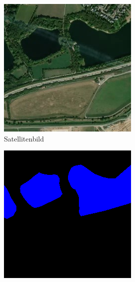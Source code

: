 \begin{figure}
    \centering
    \begin{subfigure}{0.3\textwidth}
        \centering
        \includegraphics[width=\textwidth]{images/datensatz_beispiel_satellit.jpg}
        \caption{Satellitenbild}
        \label{fig:datensatz_beispiel_satellit}
    \end{subfigure}
    \begin{subfigure}{0.3\textwidth}
        \centering
        \includegraphics[width=\textwidth]{images/datensatz_beispiel_maske.png}

\end{subfigure}
\end{figure}
